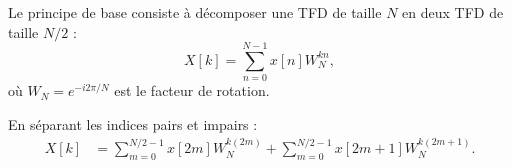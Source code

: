 Le principe de base consiste à décomposer une TFD de taille $N$ en deux TFD de taille $N/2$ :
\begin{equation}
X[k] = \sum_{n=0}^{N-1} x[n] W_N^{kn},
\end{equation}
où $W_N = e^{-i2\pi/N}$ est le facteur de rotation.

En séparant les indices pairs et impairs :
\begin{align}
X[k] &= \sum_{m=0}^{N/2-1} x[2m] W_N^{k(2m)} 
      + \sum_{m=0}^{N/2-1} x[2m+1] W_N^{k(2m+1)}.
\end{align}

